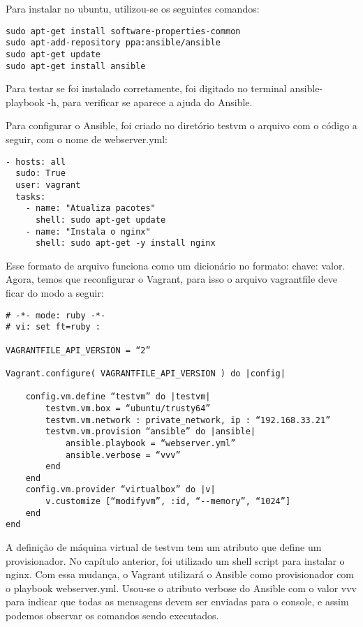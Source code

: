 Para instalar no ubuntu, utilizou-se os seguintes comandos:
\begin{lstlisting}
sudo apt-get install software-properties-common
sudo apt-add-repository ppa:ansible/ansible
sudo apt-get update
sudo apt-get install ansible
\end{lstlisting}
Para testar se foi instalado corretamente, foi digitado no terminal 
ansible-playbook -h, para verificar se aparece a ajuda do Ansible.

Para configurar o Ansible, foi criado no diretório testvm o 
arquivo com o código a seguir, com o nome de webserver.yml:
\begin{lstlisting}
- hosts: all
  sudo: True
  user: vagrant
  tasks:
    - name: "Atualiza pacotes"
      shell: sudo apt-get update
    - name: "Instala o nginx"
      shell: sudo apt-get -y install nginx
\end{lstlisting}
Esse formato de arquivo funciona como um dicionário no 
formato: chave: valor. Agora, temos que reconfigurar o Vagrant,
para isso o arquivo vagrantfile deve ficar do modo a seguir:
\begin{lstlisting}
# -*- mode: ruby -*-
# vi: set ft=ruby :

VAGRANTFILE_API_VERSION = “2”

Vagrant.configure( VAGRANTFILE_API_VERSION ) do |config|

	config.vm.define “testvm” do |testvm|
		testvm.vm.box = “ubuntu/trusty64”
		testvm.vm.network : private_network, ip : “192.168.33.21”
		testvm.vm.provision “ansible” do |ansible|
			ansible.playbook = “webserver.yml”
			ansible.verbose = “vvv”
		end
	end
	config.vm.provider “virtualbox” do |v|
		v.customize [“modifyvm”, :id, “--memory”, “1024”]
	end
end
\end{lstlisting}
A definição de máquina virtual de testvm tem um atributo 
que define um provisionador. No capítulo anterior, foi 
utilizado um shell script para instalar o nginx. Com essa 
mudança, o Vagrant utilizará o Ansible como provisionador 
com o playbook webserver.yml. Usou-se o atributo verbose 
do Ansible com o valor vvv para indicar que todas as 
mensagens devem ser enviadas para o console, e assim 
podemos observar os comandos sendo executados.

